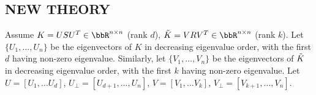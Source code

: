 \subsection{NEW THEORY}
Assume $K = USU^T \in \RR^{n \times n}$ (rank $d$), $\tK = VRV^T\in \RR^{n \times n}$ (rank $k$).
Let $\{U_1,\ldots,U_n\}$ be the eigenvectors of $K$ in decreasing eigenvalue order, with the first $d$ having non-zero eigenvalue.
Similarly, let $\{V_1,\ldots,V_n\}$ be the eigenvectors of $\tK$ in decreasing eigenvalue order, with the first $k$ having non-zero eigenvalue.
Let $U = [U_1,\ldots U_d]$, $U_{\perp} = [U_{d+1},\ldots,U_n]$, $V = [V_1,\ldots V_k]$, $V_{\perp} = [V_{k+1},\ldots,V_n]$.


